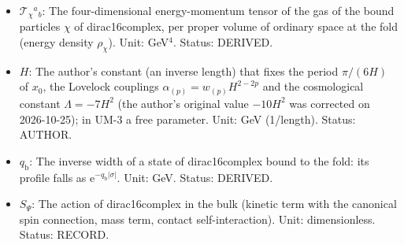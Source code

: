 \documentclass[
  10pt,
]{article}
\begin{document}
\begin{itemize}
  the coordinate volume of the extra times) at a time when
  \(\mathrm{e}^{-a_4}b_4\) is constant; it converts the
  eight-dimensional normalisation into the four-dimensional one. Unit:
  length\(^3\) (GeV\(^{-3}\)). Status: ASSUMED.
\item
  \(\mathcal{T}_\chi{}^a{}_b\): The four-dimensional energy-momentum
  tensor of the gas of the bound particles \(\chi\) of dirac16complex,
  per proper volume of ordinary space at the fold (energy density
  \(\rho_\chi\)). Unit: GeV\(^4\). Status: DERIVED.
\item
  \(H\): The author's constant (an inverse length) that fixes the period
  \(\pi/(6H)\) of \(x_0\), the Lovelock couplings
  \(\alpha_{(p)} = w_{(p)}H^{2-2p}\) and the cosmological constant
  \(\Lambda = -7H^2\) (the author's original value \(-10H^2\) was
  corrected on 2026-10-25); in UM-3 a free parameter. Unit: GeV
  (1/length). Status: AUTHOR.
\item
  \(q_{\mathrm{b}}\): The inverse width of a state of dirac16complex
  bound to the fold: its profile falls as
  \(\mathrm{e}^{-q_{\mathrm{b}}\lvert\sigma\rvert}\). Unit: GeV. Status:
  DERIVED.
\item
  \(S_\Psi\): The action of dirac16complex in the bulk (kinetic term
  with the canonical spin connection, mass term, contact
  self-interaction). Unit: dimensionless. Status: RECORD.
\end{itemize}
\end{document}
